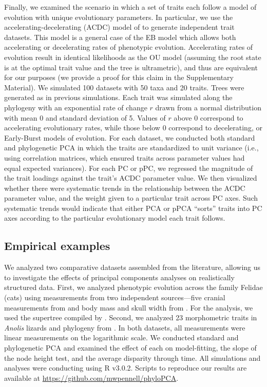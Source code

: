 \documentclass[a4paper,11pt]{article}
\begin{document}
Finally, we examined the scenario in which a set of traits each follow a model of evolution with unique evolutionary parameters. In particular, we use the accelerating-decelerating (ACDC) model of \citet{Blomberg2003} to generate independent trait datasets. This model is a general case of the EB model which allows both accelerating or decelerating rates of phenotypic evolution. Accelerating rates of evolution result in identical likelihoods as the OU model (assuming the root state is at the optimal trait value and the tree is ultrametric), and thus are equivalent for our purposes (we provide a proof for this claim in the Supplementary Material). We simulated 100 datasets with 50 taxa and 20 traits. Trees were generated as in previous simulations. Each trait was simulated along the phylogeny with an exponential rate of change $r$ drawn from a normal distribution with mean 0 and standard deviation of 5. Values of $r$ above 0 correspond to accelerating evolutionary rates, while those below 0 correspond to decelerating, or Early-Burst models of evolution. For each dataset, we conducted both standard and phylogenetic PCA in which the traits are standardized to unit variance (i.e., using correlation matrices, which ensured traits across parameter values had equal expected variances). For each PC or pPC, we regressed the magnitude of the trait loadings against the trait's ACDC parameter value. We then visualized whether there were systematic trends in the relationship between the ACDC parameter value, and the weight given to a particular trait across PC axes. Such systematic trends would indicate that either PCA or pPCA ``sorts'' traits into PC axes according to the particular evolutionary model each trait follows.

\subsection{Empirical examples}
We analyzed two comparative datasets assembled from the literature, allowing us to investigate the effects of principal components analyses on realistically structured data. First, we analyzed phenotypic evolution across the family Felidae (cats) using measurements from two independent sources---five cranial measurements from \cite{slater_2009} and body mass and skull width from \cite{sakamoto_2010}. For the analysis, we used the supertree compiled by \cite{Nyakatura_2012}. Second, we analyzed 23 morphometric traits in \textit{Anolis} lizards and phylogeny from \cite{Mahler2010}. In both datasets, all measurements were linear measurements on the logarithmic scale. We conducted standard and phylogenetic PCA and examined the effect of each on model-fitting, the slope of the node height test, and the average disparity through time. All simulations and analyses were conducting using R v3.0.2. Scripts to reproduce our results are available at \url{https://github.com/mwpennell/phyloPCA}.
  
\end{document}
